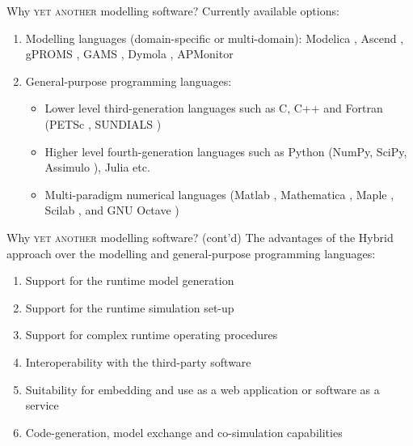 \documentclass[compress,newPxFont,sthlmFooter]{beamer}
\newcommand{\skipcite}[1]{}
\begin{document}
\begin{frame}{Why \textsc{yet another} modelling software?}
Currently available options:
\begin{enumerate}
   \item \alert{Modelling languages} (domain-specific or multi-domain):
         Modelica \skipcite{Fritzson-and-Engelson-1998}, Ascend \skipcite{Piela-etal-1991}, gPROMS \skipcite{Barton-and-Pantelides-1994}, 
         GAMS \skipcite{Brook-etal-1988}, Dymola \skipcite{Elmqvist-1978}, APMonitor \skipcite{APMonitor-2014}
   \item \alert{General-purpose programming languages}:
      \begin{itemize}
          \item Lower level third-generation languages such as C, C++ and Fortran
                (PETSc \skipcite{petsc}, SUNDIALS \skipcite{Hindmarsh-etal-2005})
          \item Higher level fourth-generation languages such as Python (NumPy, SciPy, Assimulo \skipcite{Assimulo-2015}), Julia etc.
          \item Multi-paradigm numerical languages 
                (Matlab \skipcite{matlab}, Mathematica \skipcite{mathematica}, Maple \skipcite{maple}, 
                Scilab \skipcite{scilab}, and GNU Octave \skipcite{octave})
      \end{itemize}
 \end{enumerate}
\end{frame}

\begin{frame}{Why \textsc{yet another} modelling software? (cont'd)}
  The advantages of the \alert{Hybrid} approach over the \alert{modelling} and \alert{general-purpose} programming languages:
    \begin{enumerate}
        \item Support for the \alert{runtime model generation}
        \item Support for the \alert{runtime simulation set-up}
        \item Support for \alert{complex runtime operating procedures}
        \item \alert{Interoperability} with the \alert{third-party software}
        \item Suitability for \alert{embedding} and use as a \alert{web application} or \alert{software as a service}
        \item \alert{Code-generation}, \alert{model exchange} and \alert{co-simulation} capabilities  
    \end{enumerate}
\end{frame}
\end{document}

